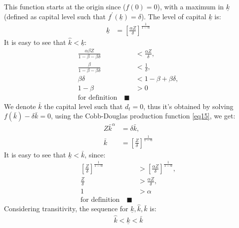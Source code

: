 \documentclass[12pt]{report}
\begin{document}
This function starts at the origin since (\(f(0)=0\)), with a maximum in \(\underline{k}\) (defined as capital level
such that \(f^{\prime}(\underline{k})=\delta\)). The level of capital \(\underline{k}\) is:
\begin{align}
    \underline{k} &= \left[\frac{\alpha Z}{\delta}\right]^{\frac{1}{1-\alpha}}  \label{eq19}
\end{align}
It is easy to see that \(\hat{k}<\underline{k}\):
\begin{align*}
    \frac{\alpha \beta Z}{1-\beta-\beta \delta}&<\frac{\alpha Z}{\delta},\\
    \frac{\beta}{1-\beta-\beta \delta}&<\frac{1}{\delta},\\
    \beta \delta &<1-\beta + \beta \delta, \\
    1-\beta&>0 \\
    \text{for definition} \quad \blacksquare 
\end{align*}
We denote \(\bar{k}\) the capital level such that \(d_t=0\), thus it's obtained by solving \(f(\bar{k}) -\delta
\bar{k} = 0\), using the Cobb-Douglas production function \ref{eq15}, we get:
\begin{align}
    Z \bar{k}^{\alpha} &= \delta \bar{k}, \nonumber\\
    \bar{k}&=\left[\frac{Z}{\delta}\right]^{\frac{1}{1-\alpha}}
\end{align}
It is easy to see that \(\underline{k}<\bar{k}\), since:
\begin{align}
    \left[\frac{Z}{\delta}\right]^{\frac{1}{1-\alpha}}&>\left[\frac{\alpha Z}{\delta}\right]^{\frac{1}{1-\alpha}},\nonumber\\
    \frac{Z}{\delta}&>\frac{\alpha Z}{\delta}, \nonumber \\
    1&>\alpha \nonumber \\
    \text{for definition} \quad \blacksquare 
\end{align}
Considering transitivity, the sequence for \(\underline{k}, \hat{k}, \bar{k}\) is:
\begin{align*}
    \hat{k} < \underline{k} < \bar{k}
\end{align*}
\end{document}
